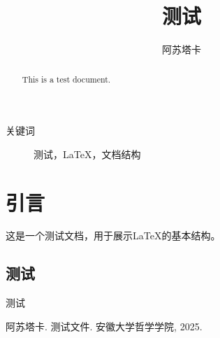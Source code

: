 \documentclass[a4paper]{article}
\title{测试}
\author{阿苏塔卡}
\affil{安徽大学哲学学院}
\begin{document}
\maketitle
\begin{abstract}
This is a test document.
\end{abstract}
\begin{description}
\item[关键词] 测试，LaTeX，文档结构
\end{description}
\section{引言}
这是一个测试文档，用于展示LaTeX的基本结构\cite{1}。
\subsection{测试}
测试
\begin{thebibliography}{114514}
 阿苏塔卡. 测试文件. 安徽大学哲学学院, 2025.
\end{thebibliography}
\end{document}
